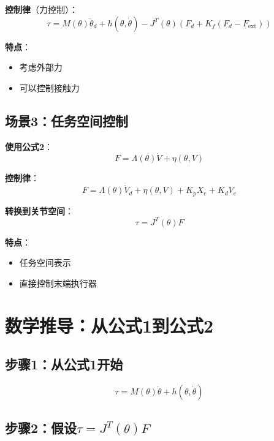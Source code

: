 \documentclass[12pt,a4paper]{article}
\begin{document}
\textbf{控制律}（力控制）：
\begin{equation}
\tau = M(\theta)\ddot{\theta}_d + h(\theta, \dot{\theta}) - J^T(\theta)(F_d + K_f(F_d - F_{\text{ext}}))
\end{equation}

\textbf{特点}：
\begin{itemize}
\item 考虑外部力
\item 可以控制接触力
\end{itemize}

\subsection{场景3：任务空间控制}

\textbf{使用公式2}：
\begin{equation}
F = \Lambda(\theta)\dot{V} + \eta(\theta, V)
\end{equation}

\textbf{控制律}：
\begin{equation}
F = \Lambda(\theta)\dot{V}_d + \eta(\theta, V) + K_p X_e + K_d V_e
\end{equation}

\textbf{转换到关节空间}：
\begin{equation}
\tau = J^T(\theta)F
\end{equation}

\textbf{特点}：
\begin{itemize}
\item 任务空间表示
\item 直接控制末端执行器
\end{itemize}

\section{数学推导：从公式1到公式2}

\subsection{步骤1：从公式1开始}

\begin{equation}
\tau = M(\theta)\ddot{\theta} + h(\theta, \dot{\theta}) \tag{8.82}
\end{equation}

\subsection{步骤2：假设$\tau = J^T(\theta)F$}
\end{document}
